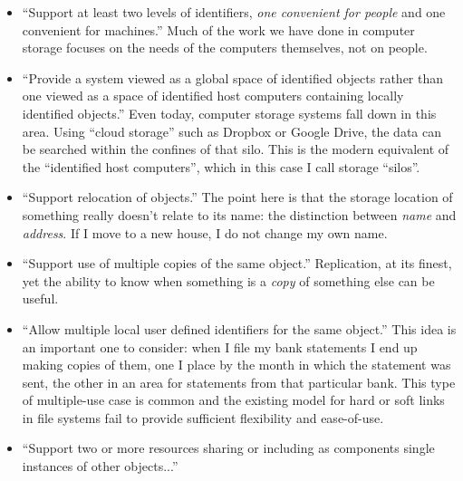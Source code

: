 \begin{itemize}
    \item ``Support at least two levels of identifiers, \emph{one convenient for
              people} and one convenient for machines.'' Much of the work we have done in
          computer storage focuses on the needs of the computers themselves, not on
          people.

    \item ``Provide a system viewed as a global space of identified objects
          rather than one viewed as a space of identified host computers containing
          locally identified objects.'' Even today, computer storage systems fall down
          in this area. Using ``cloud storage'' such as Dropbox or Google Drive, the
          data can be searched within the confines of that silo. This is the modern
          equivalent of the ``identified host computers'', which in this case I call
          storage ``silos''.

    \item ``Support relocation of objects.''  The point here is that the storage
          location of something really doesn't relate to its name: the distinction
          between \emph{name} and \emph{address}.  If I move to a new house, I do not
          change my own name.

    \item ``Support use of multiple copies of the same object.''  Replication,
          at its finest, yet the ability to know when something is a \emph{copy} of
          something else can be useful.

    \item ``Allow multiple local user defined identifiers for the same object.''
          This idea is an important one to consider: when I file my bank statements I
          end up making copies of them, one I place by the month in which the
          statement was sent, the other in an area for statements from that particular
          bank. This type of multiple-use case is common and the existing model for
          hard or soft links in file systems fail to provide sufficient flexibility
          and ease-of-use.

    \item ``Support two or more resources sharing or including as components
          single instances of other objects...'' 

\end{itemize}

